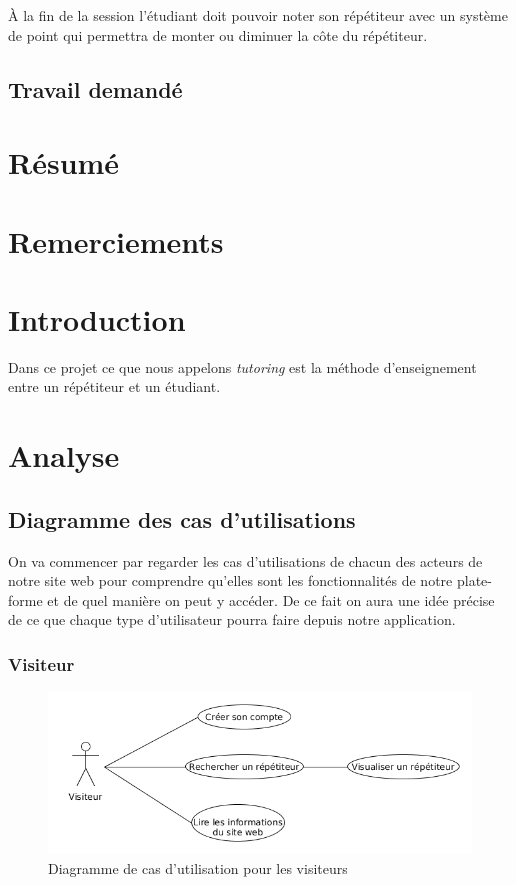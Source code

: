 \documentclass[a4paper]{scrreprt}
\begin{document}
À la fin de la session l'étudiant doit pouvoir noter son répétiteur avec un système de point qui permettra de monter ou diminuer la côte du répétiteur.

\section*{Travail demandé}

\chapter*{Résumé}
\chapter*{Remerciements}

\tableofcontents

\listoffigures

\listoflistings

\printglossaries

\chapter{Introduction}
Dans ce projet ce que nous appelons \textit{tutoring} est la méthode d'enseignement entre un répétiteur et un étudiant.

\chapter{Analyse}
\section{Diagramme des cas d'utilisations}
On va commencer par regarder les cas d'utilisations de chacun des acteurs de notre site web pour comprendre qu'elles sont les fonctionnalités de notre plate-forme et de quel manière on peut y accéder. De ce fait on aura une idée précise de ce que chaque type d'utilisateur pourra faire depuis notre application.
\subsection{Visiteur}
\begin{figure}[H]
  \centering
  \includegraphics[width=\textwidth]{img/UseCase_Visiteur.png}
  \caption{Diagramme de cas d'utilisation pour les visiteurs}
  \label{fig:uc_visiteur}
\end{figure}
\end{document}
